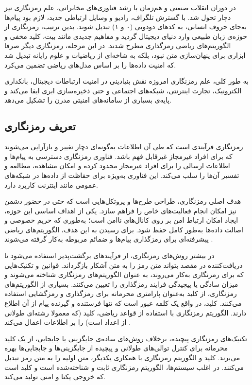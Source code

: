 در دوران انقلاب صنعتی و هم‌زمان با رشد فناوری‌های مخابراتی، علم رمزنگاری نیز دچار تحول شد. با گسترش تلگراف، رادیو و وسایل ارتباطی جدید، لازم بود پیام‌ها به‌جای حروف انسانی، به کدهای دودویی (۰ و ۱) تبدیل شوند. بدین ترتیب، رمزنگاری از حوزه‌ی زبان طبیعی وارد دنیای دیجیتال گردید و مفاهیم جدیدی مانند بیت، کلید مخفی و الگوریتم‌های ریاضی رمزگذاری مطرح شدند. در این مرحله، رمزنگاری دیگر صرفا ابزاری برای پنهان‌سازی متن نبود، بلکه به شاخه‌ای از ریاضیات و علوم رایانه تبدیل شد که امنیت داده‌ها را بر اساس مدل‌های ریاضی تضمین می‌کرد\cite{ref16}.

به طور کلی، علم رمزنگاری امروزه نقش بنیادینی در امنیت ارتباطات دیجیتال، بانکداری الکترونیک، تجارت اینترنتی، شبکه‌های اجتماعی و حتی ذخیره‌سازی ابری ایفا می‌کند و پایه‌ی بسیاری از سامانه‌های امنیتی مدرن را تشکیل می‌دهد.

\subsection{تعریف رمزنگاری}

رمزنگاری فرآیندی است که طی آن اطلاعات به‌گونه‌ای دچار تغییر و بازآرایی می‌شوند که برای افراد غیرمجاز غیرقابل فهم باشد. فناوری رمزنگاری دسترسی به پیام‌ها و اطلاعات ارسالی را برای افراد غیرمجاز محدود کرده و امکان مشاهده، مطالعه و تفسیر آن‌ها را سلب می‌کند. این فناوری به‌ویژه برای حفاظت از داده‌ها در شبکه‌های عمومی مانند اینترنت کاربرد دارد\cite{ref17}.

هدف اصلی رمزنگاری، طراحی طرح‌ها و پروتکل‌هایی است که حتی در حضور دشمن نیز امکان انجام فعالیت‌های خاص را فراهم سازد. یکی از اهداف اساسی این حوزه، ایجاد امکان ارتباط امن بر روی کانال‌های ناامن است؛ به‌طوری که حریم خصوصی و اصالت داده‌ها به‌طور کامل حفظ شود. برای رسیدن به این هدف، الگوریتم‌های ریاضی پیشرفته‌ای برای رمزگذاری پیام‌ها و ضمائم مربوطه به‌کار گرفته می‌شوند \cite{ref18}.

در بیشتر روش‌های رمزنگاری، از فرآیندهای برگشت‌پذیر استفاده می‌شود تا دریافت‌کننده در مقصد بتواند متن رمز را به متن آشکار  بازگرداند. قوانین و تکنیک‌هایی که برای رمزنگاری به‌کار می‌روند، به عنوان الگوریتم‌های رمزنگاری شناخته می‌شوند و میزان سادگی یا پیچیدگی فرایند رمزگذاری را تعیین می‌کنند. بسیاری از الگوریتم‌های رمزنگاری، از کلید  به‌عنوان پارامتری محرمانه برای رمزگذاری و رمزگشایی استفاده می‌کنند. کلید، در واقع یک کلمه عبور است که تنها فرستنده و گیرنده پیام از آن اطلاع دارند. الگوریتم رمزنگاری با استفاده از قواعد ریاضی، کلید (که معمولا رشته‌ای طولانی از اعداد است) را بر اطلاعات اعمال می‌کند \cite{ref19}.

تکنیک‌های رمزنگاری پیچیده، برخلاف روش‌های ساده‌ی جایگزینی یا جابجایی، از یک کلید محرمانه برای کنترل توالی‌های طولانی و پیچیده از جایگزینی‌ها و جابجایی‌ها بهره می‌برند. کلید و الگوریتم رمزنگاری با همکاری یکدیگر، متن اولیه را به متن رمز تبدیل می‌کنند. در اغلب سیستم‌ها، الگوریتم رمزنگاری ثابت و شناخته‌شده است و کلید است که خروجی یکتا و امنی تولید می‌کند\cite{ref20}.

